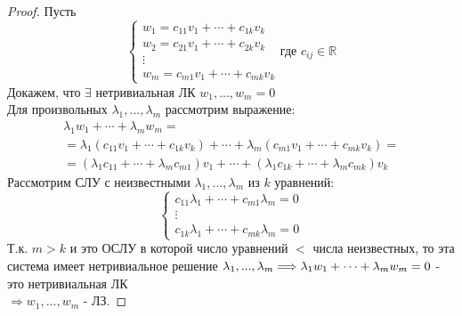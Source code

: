 \documentclass[a4paper, 12pt]{article}
\newcommand{\R}{\mathbb R}
\theoremstyle{definition}
\begin{document}
  \begin{proof}
    Пусть 
    $$\begin{cases}
      w_1 = c_{11}v_1+\cdots+c_{1k}v_k \\
      w_2 = c_{21}v_1+\cdots+c_{2k}v_k \\
      \vdots \\
      w_m = c_{m1}v_1+\cdots+c_{mk}v_k
    \end{cases}
    \text{где } c_{ij} \in \R
    $$
    Докажем, что $\exists$ нетривиальная ЛК $w_1,...,w_m=0$ \\
    Для произвольных $\lambda_1,...,\lambda_m$ рассмотрим выражение: 
    \begin{multline*}
      \lambda_1w_1 +\cdots+\lambda_mw_m = \\ = \lambda_1(c_{11}v_1+\cdots+c_{1k}v_k) + \cdots + \lambda_m(c_{m1}v_1+\cdots+c_{mk}v_k) = \\ = (\lambda_1c_{11}+\cdots+\lambda_mc_{m1})v_1+\cdots+(\lambda_1c_{1k}+\cdots+\lambda_mc_{mk})v_k 
    \end{multline*}
    Рассмотрим СЛУ с неизвестными $\lambda_1,...,\lambda_m$ из $k$ уравнений:
    $$\begin{cases}
      c_{11}\lambda_1+\cdots+c_{m1}\lambda_m=0 \\
      \vdots \\
      c_{1k}\lambda_1+\cdots+c_{mk}\lambda_m=0
    \end{cases}$$ 
    Т.к. $m>k$ и это ОСЛУ в которой число уравнений $<$ числа неизвестных, то эта система имеет нетривиальное решение 
    $\lambda_1,...,\lambda_m \\ \Longrightarrow \lambda_1w_1+\cdots+\lambda_mw_m = 0$ - это нетривиальная ЛК \\ $\Longrightarrow w_1,...,w_m$ - ЛЗ. 
  \end{proof} 
\end{document}
